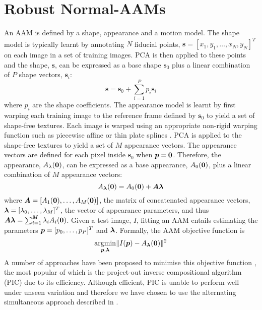 \section{Robust Normal-AAMs}\label{sec:robust-normal-aams}
An AAM is defined by a shape, appearance and a motion model. The shape model is typically learnt by annotating $N$ fiducial points, $\boldsymbol{s} = [x_1, y_1, \ldots, x_N, y_N]^T$ on each image in a set of training images. PCA is then applied to these points and the shape, $\boldsymbol{s}$, can be expressed as a base shape $\boldsymbol{s}_0$ plus a linear combination of $P$ shape vectors, $\boldsymbol{s}_i$:
\begin{equation}\label{eq:aam-shape-model}
    \boldsymbol{s} = \boldsymbol{s}_0 + \sum^P_{i=1} p_i \boldsymbol{s}_i
\end{equation}
where $p_i$ are the shape coefficients. The appearance model is learnt by first warping each training image to the reference frame defined by $\boldsymbol{s}_0$ to yield a set of shape-free textures. Each image is warped using an appropriate non-rigid warping function such as piecewise affine \cite{RefWorks:227} or thin plate splines \cite{RefWorks:277}. PCA is applied to the shape-free textures to yield a set of $M$ appearance vectors. The appearance vectors are defined for each pixel inside $\boldsymbol{s}_0$ when $\boldsymbol{p} = \boldsymbol{0}$. Therefore, the appearance, $A_\lambda(\boldsymbol{0})$, can be expressed as a base appearance, $A_0(\boldsymbol{0})$, plus a linear combination of $M$ appearance vectors:
\begin{equation}\label{eq:aam-appearance-model}
    A_{\blambda}(\zero) = A_0(\zero) + \boldsymbol{A} \blambda
\end{equation}
where $\boldsymbol{A} = [A_1(\boldsymbol{0}), \ldots, A_M(\boldsymbol{0})]$, the matrix of concatenated appearance vectors, $\boldsymbol{\lambda} = [\lambda_0, \ldots, \lambda_M]^T$, the vector of appearance parameters, and thus $\boldsymbol{A} \boldsymbol{\lambda} = \sum^M_{i=1} \lambda_i A_i(\boldsymbol{0})$. Given a test image, $I$, fitting an AAM entails estimating the parameters $\boldsymbol{p} = [p_0, \ldots, p_P]^T$ and $\boldsymbol{\lambda}$. Formally, the AAM objective function is
\begin{equation}\label{eq:aam-objective}
    \argmin_{\p,\blambda} \norm{I(\p) - A_{\blambda}(\zero)}^2
\end{equation}
A number of approaches have been proposed to minimise this objective function \cite{RefWorks:277,RefWorks:227,RefWorks:95,RefWorks:278}, the most popular of which is the project-out inverse compositional algorithm (PIC) \cite{RefWorks:279,RefWorks:227} due to its efficiency. Although efficient, PIC is unable to perform well under unseen variation and therefore we have chosen to use the alternating simultaneous approach described in \cite{RefWorks:277}.
